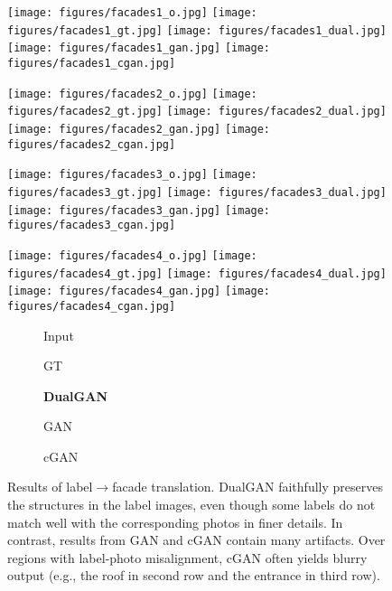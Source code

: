


\begin{figure}
\begin{center}
\texttt{[image: figures/facades1\_o.jpg]}
\texttt{[image: figures/facades1\_gt.jpg]}
\texttt{[image: figures/facades1\_dual.jpg]}
\texttt{[image: figures/facades1\_gan.jpg]}
\texttt{[image: figures/facades1\_cgan.jpg]}

\texttt{[image: figures/facades2\_o.jpg]}
\texttt{[image: figures/facades2\_gt.jpg]}
\texttt{[image: figures/facades2\_dual.jpg]}
\texttt{[image: figures/facades2\_gan.jpg]}
\texttt{[image: figures/facades2\_cgan.jpg]}

\texttt{[image: figures/facades3\_o.jpg]}
\texttt{[image: figures/facades3\_gt.jpg]}
\texttt{[image: figures/facades3\_dual.jpg]}
\texttt{[image: figures/facades3\_gan.jpg]}
\texttt{[image: figures/facades3\_cgan.jpg]}

\texttt{[image: figures/facades4\_o.jpg]}
\texttt{[image: figures/facades4\_gt.jpg]}
\texttt{[image: figures/facades4\_dual.jpg]}
\texttt{[image: figures/facades4\_gan.jpg]}
\texttt{[image: figures/facades4\_cgan.jpg]}

\begin{subfigure}[]{0.19\linewidth}\caption*{Input}\end{subfigure}
\begin{subfigure}[]{0.19\linewidth}\caption*{GT}\end{subfigure}
\begin{subfigure}[]{0.19\linewidth}\caption*{\textbf{DualGAN}}\end{subfigure}
\begin{subfigure}[]{0.19\linewidth}\caption*{GAN}\end{subfigure}
\begin{subfigure}[]{0.19\linewidth}\caption*{cGAN~\cite{isola2016image}}\end{subfigure}
\caption{Results of label$\rightarrow$facade translation. DualGAN faithfully preserves the structures 
in the label images, even though some labels do not match well with the corresponding photos
in finer details. In contrast, results from GAN and cGAN contain many artifacts. Over regions with
label-photo misalignment, cGAN often yields blurry output (e.g., the roof in second row and 
the entrance in third row).}
\label{fig:facades}
\end{center}
\end{figure}

